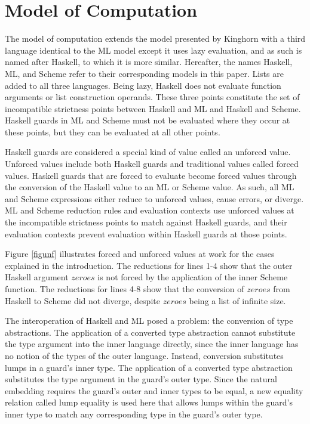 \section{Model of Computation}

The model of computation extends the model presented by Kinghorn \cite{kinghorn07} with a third language identical to the ML model except it uses lazy evaluation, and as such is named after Haskell, to which it is more similar. Hereafter, the names Haskell, ML, and Scheme refer to their corresponding models in this paper. Lists are added to all three languages. Being lazy, Haskell does not evaluate function arguments or list construction operands. These three points constitute the set of incompatible strictness points between Haskell and ML and Haskell and Scheme. Haskell guards in ML and Scheme must not be evaluated where they occur at these points, but they can be evaluated at all other points.

Haskell guards are considered a special kind of value called an unforced value. Unforced values include both Haskell guards and traditional values called forced values. Haskell guards that are forced to evaluate become forced values through the conversion of the Haskell value to an ML or Scheme value. As such, all ML and Scheme expressions either reduce to unforced values, cause errors, or diverge. ML and Scheme reduction rules and evaluation contexts use unforced values at the incompatible strictness points to match against Haskell guards, and their evaluation contexts prevent evaluation within Haskell guards at those points.

Figure \ref{figunf} illustrates forced and unforced values at work for the cases explained in the introduction. The reductions for lines 1-4 show that the outer Haskell argument $zeroes$ is not forced by the application of the inner Scheme function. The reductions for lines 4-8 show that the conversion of $zeroes$ from Haskell to Scheme did not diverge, despite $zeroes$ being a list of infinite size.



The interoperation of Haskell and ML posed a problem: the conversion of type abstractions. The application of a converted type abstraction cannot substitute the type argument into the inner language directly, since the inner language has no notion of the types of the outer language. Instead, conversion substitutes lumps in a guard's inner type. The application of a converted type abstraction substitutes the type argument in the guard's outer type. Since the natural embedding \cite{matthews07} requires the guard's outer and inner types to be equal, a new equality relation called lump equality is used here that allows lumps within the guard's inner type to match any corresponding type in the guard's outer type.

